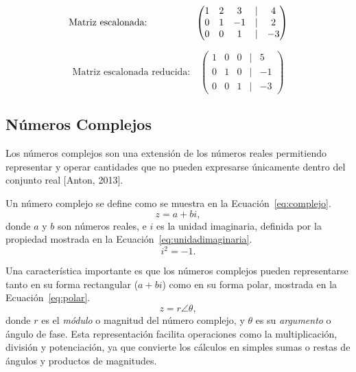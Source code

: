 \documentclass[12pt,a4paper]{article}
\begin{document}
\[
\text{Matriz escalonada:\quad \quad \quad \quad}\quad
\begin{pmatrix}
1 & 2 & 3 & | & 4 \\
0 & 1 & -1 & | & 2 \\
0 & 0 & 1 & | & -3
\end{pmatrix}
\]


\[
\text{Matriz escalonada reducida:}\quad
\begin{pmatrix}
1 & 0 & 0 & | & 5 \\
0 & 1 & 0 & | & -1 \\
0 & 0 & 1 & | & -3
\end{pmatrix}
\]

\subsection{Números Complejos}

Los números complejos son una extensión de los números reales permitiendo representar y operar cantidades que no pueden expresarse únicamente dentro del conjunto real [Anton, 2013].

Un número complejo se define como se muestra en la Ecuación~\ref{eq:complejo}.
\begin{equation}
z = a + bi,
\label{eq:complejo}
\end{equation}
donde $a$ y $b$ son números reales, e $i$ es la unidad imaginaria, definida por la propiedad mostrada en la Ecuación~\ref{eq:unidadimaginaria}.
\begin{equation}
i^2 = -1.
\label{eq:unidadimaginaria}
\end{equation}


Una característica importante es que los números complejos pueden representarse tanto en su forma rectangular ($a + bi$) como en su forma polar, mostrada en la Ecuación~\ref{eq:polar}.
\begin{equation}
z = r \angle \theta,
\label{eq:polar}
\end{equation}
donde $r$ es el \textit{módulo} o magnitud del número complejo, y $\theta$ es su \textit{argumento} o ángulo de fase. Esta representación facilita operaciones como la multiplicación, división y potenciación, ya que convierte los cálculos en simples sumas o restas de ángulos y productos de magnitudes.
\end{document}

